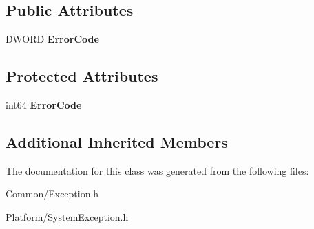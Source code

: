 \subsection*{Public Attributes}
\begin{DoxyCompactItemize}
\item 
\mbox{\label{struct_gost_crypt_1_1_system_exception_a6407b6fe8f2335b58eceba55958d5c64}} 
D\+W\+O\+RD {\bfseries Error\+Code}
\end{DoxyCompactItemize}
\subsection*{Protected Attributes}
\begin{DoxyCompactItemize}
\item 
\mbox{\label{struct_gost_crypt_1_1_system_exception_ad129e635b3c747218797ffc8ae57bb10}} 
int64 {\bfseries Error\+Code}
\end{DoxyCompactItemize}
\subsection*{Additional Inherited Members}


The documentation for this class was generated from the following files\+:\begin{DoxyCompactItemize}
\item 
Common/Exception.\+h\item 
Platform/System\+Exception.\+h\end{DoxyCompactItemize}
